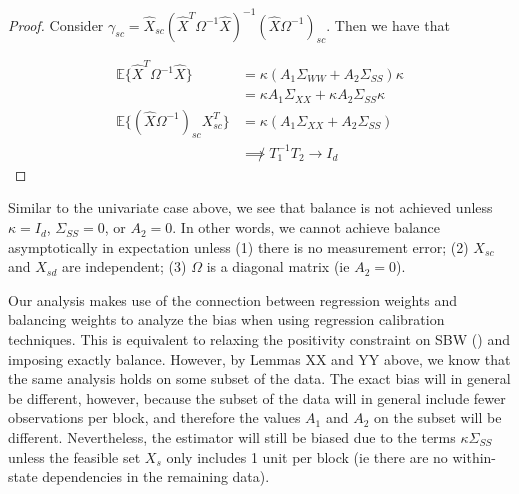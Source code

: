 \begin{proof}

    Consider $\gamma_{sc} = \hat{X}_{sc}(\hat{X}^T\Omega^{-1}\hat{X})^{-1}(\hat{X}\Omega^{-1})_{sc}$. Then we have that
    
    \begin{align*}
        \mathbb{E}\{\hat{X}^T\Omega^{-1}\hat{X}\} &= 
        \kappa(A_1\Sigma_{WW} + A_2\Sigma_{SS})\kappa \\
        &= \kappa A_1\Sigma_{XX} + \kappa A_2\Sigma_{SS} \kappa \\
        \mathbb{E}\{(\hat{X}\Omega^{-1})_{sc}X_{sc}^T\} &= \kappa(A_1\Sigma_{XX} + A_2\Sigma_{SS}) \\
        &\not\implies T_1^{-1}T_2 \to I_d
    \end{align*}
\end{proof}

\begin{remark}
Similar to the univariate case above, we see that balance is not achieved unless $\kappa = I_d$, $\Sigma_{SS} = 0$, or $A_2 = 0$. In other words, we cannot achieve balance asymptotically in expectation unless (1) there is no measurement error; (2) $X_{sc}$ and $X_{sd}$ are independent; (3) $\Omega$ is a diagonal matrix (ie $A_2 = 0$).
\end{remark}

Our analysis makes use of the connection between regression weights and balancing weights to analyze the bias when using regression calibration techniques. This is equivalent to relaxing the positivity constraint on SBW (\cite{chattopadhyay2021implied}) and imposing exactly balance. However, by Lemmas XX and YY above, we know that the same analysis holds on some subset of the data. The exact bias will in general be different, however, because the subset of the data will in general include fewer observations per block, and therefore the values $A_1$ and $A_2$ on the subset will be different. Nevertheless, the estimator will still be biased due to the terms $\kappa\Sigma_{SS}$ unless the feasible set $X_s$ only includes 1 unit per block (ie there are no within-state dependencies in the remaining data).
